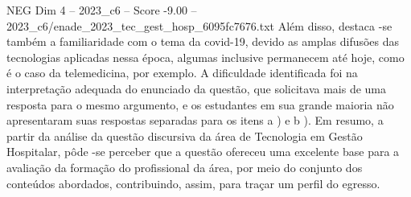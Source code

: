 \begin{textsample}{NEG Dim 4 – 2023\_c6 – Score -9.00 – 2023\_c6/enade\_2023\_tec\_gest\_hosp\_6095fc7676.txt}
Além disso, destaca -se também a familiaridade com o tema da covid-19, devido as amplas difusões das tecnologias aplicadas nessa época, algumas inclusive permanecem até hoje, como é o caso da telemedicina, por exemplo.
A dificuldade identificada foi na interpretação adequada do enunciado da questão, que solicitava mais de uma resposta para o mesmo argumento, e os estudantes em sua grande maioria não apresentaram suas respostas separadas para os itens a ) e b ).
Em resumo, a partir da análise da questão discursiva da área de Tecnologia em Gestão Hospitalar, pôde -se perceber que a questão ofereceu uma excelente base para a avaliação da formação do profissional da área, por meio do conjunto dos conteúdos abordados, contribuindo, assim, para traçar um perfil do egresso.

\end{textsample}
